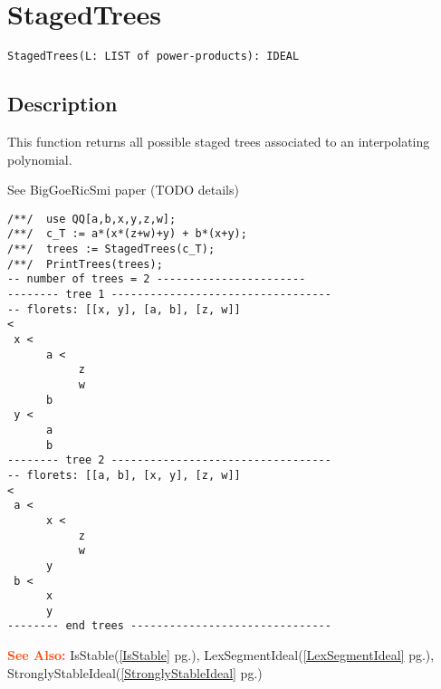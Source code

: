 \documentclass[a4paper]{mybook}
\newenvironment{command}{}{} %
\newcommand\SeeAlso{\par\textcolor{OrangeRed}{\textbf{\large See Also: }}}
\begin{document}
\section{StagedTrees}
\label{StagedTrees}
\begin{command} %


\begin{Verbatim}[label=syntax, rulecolor=\color{MidnightBlue},
frame=single]
StagedTrees(L: LIST of power-products): IDEAL
\end{Verbatim}


\subsection*{Description}

This function returns all possible staged trees associated to an
interpolating polynomial.
\par 
See BigGoeRicSmi paper (TODO details)
\begin{Verbatim}[label=example, rulecolor=\color{PineGreen}, frame=single]
/**/  use QQ[a,b,x,y,z,w];
/**/  c_T := a*(x*(z+w)+y) + b*(x+y);
/**/  trees := StagedTrees(c_T);
/**/  PrintTrees(trees);
-- number of trees = 2 -----------------------
-------- tree 1 ----------------------------------
-- florets: [[x, y], [a, b], [z, w]]
< 
 x < 
      a < 
           z 
           w 
      b 
 y < 
      a 
      b 
-------- tree 2 ----------------------------------
-- florets: [[a, b], [x, y], [z, w]]
< 
 a < 
      x < 
           z 
           w 
      y 
 b < 
      x 
      y 
-------- end trees -------------------------------
\end{Verbatim}


\SeeAlso %
  IsStable(\ref{IsStable} pg.\pageref{IsStable}), 
    LexSegmentIdeal(\ref{LexSegmentIdeal} pg.\pageref{LexSegmentIdeal}), 
    StronglyStableIdeal(\ref{StronglyStableIdeal} pg.\pageref{StronglyStableIdeal})
\end{command} %
\end{document}
